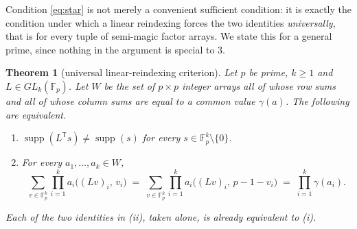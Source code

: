 \documentclass[11pt,a4paper]{amsart}
\theoremstyle{plain}
\newtheorem{theorem}{Theorem}[section]
\theoremstyle{definition}
\theoremstyle{remark}
\newcommand{\FF}{\mathbb{F}}
\newcommand{\supp}{\operatorname{supp}}
\newcommand{\tr}{\mathsf{T}}
\begin{document}
Condition \eqref{eq:star} is not merely a convenient sufficient condition: it is
exactly the condition under which a linear reindexing forces the two identities
\emph{universally}, that is for every tuple of semi-magic factor arrays. We
state this for a general prime, since nothing in the argument is special to $3$.

\begin{theorem}[universal linear-reindexing criterion]\label{thm:converse}
Let $p$ be prime, $k\ge1$ and $L\in GL_k(\FF_p)$. Let $W$ be the set of
$p\times p$ integer arrays all of whose row sums and all of whose column sums
are equal to a common value $\gamma(a)$. The following are equivalent.
\begin{enumerate}
\item[\textup{(i)}] $\supp(L^{\tr}s)\ne\supp(s)$ for every
  $s\in\FF_p^k\setminus\{0\}$.
\item[\textup{(ii)}] For \emph{every} $a_1,\dots,a_k\in W$,
\[
\sum_{v\in\FF_p^k}\prod_{i=1}^{k}a_i\big((Lv)_i,\,v_i\big)
\;=\;
\sum_{v\in\FF_p^k}\prod_{i=1}^{k}a_i\big((Lv)_i,\,p-1-v_i\big)
\;=\;\prod_{i=1}^{k}\gamma(a_i).
\]
\end{enumerate}
Each of the two identities in \textup{(ii)}, taken alone, is already equivalent
to \textup{(i)}.
\end{theorem}
\end{document}
